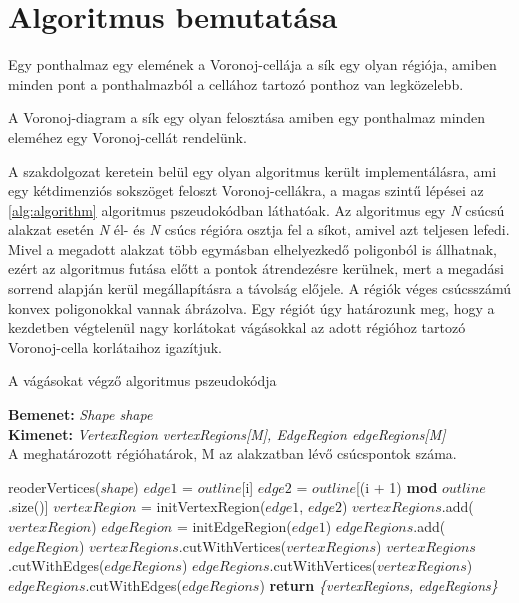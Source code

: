 \section{Algoritmus bemutatása}

\begin{definition}
	Egy ponthalmaz egy elemének a Voronoj-cellája \cite{voronoj} a sík egy olyan régiója, amiben minden pont a ponthalmazból a cellához tartozó ponthoz van legközelebb.
\end{definition}

\begin{definition}
	A Voronoj-diagram a sík egy olyan felosztása amiben egy ponthalmaz minden eleméhez egy Voronoj-cellát rendelünk.
\end{definition}

A szakdolgozat keretein belül egy olyan algoritmus \cite{sdfalgorithmpaper} került implementálásra, ami egy kétdimenziós sokszöget feloszt Voronoj-cellákra, a magas szintű lépései az \ref{alg:algorithm} algoritmus pszeudokódban láthatóak. Az algoritmus egy \textit{N} csúcsú alakzat esetén \textit{N} él- és \textit{N} csúcs régióra osztja fel a síkot, amivel azt teljesen lefedi. Mivel a megadott alakzat több egymásban elhelyezkedő poligonból is állhatnak, ezért az algoritmus futása előtt a pontok átrendezésre kerülnek, mert a megadási sorrend alapján kerül megállapításra a távolság előjele. A régiók véges csúcsszámú konvex poligonokkal vannak ábrázolva. Egy régiót úgy határozunk meg, hogy a kezdetben végtelenül nagy korlátokat vágásokkal az adott régióhoz tartozó Voronoj-cella korlátaihoz igazítjuk.

\begin{algorithm}[H]
	\caption{A vágásokat végző algoritmus pszeudokódja}
	\label{alg:algorithm}
	\textbf{Bemenet:} \textit{Shape shape} \\
	\textbf{Kimenet:} \textit{VertexRegion vertexRegions[M], EdgeRegion edgeRegions[M]}\\A meghatározott régióhatárok, M az alakzatban lévő csúcspontok száma.
	\begin{algorithmic}[1]
		\State reoderVertices(\textit{shape})
		\State $edge1$ = $outline$[i]
		\State $edge2$ = $outline$[(i + 1) \textbf{mod} $outline$.size()]
		\State $vertexRegion$ = initVertexRegion($edge1$, $edge2$)
		\State $vertexRegions$.add($vertexRegion$)
		\State $edgeRegion$ = initEdgeRegion($edge1$)
		\State $edgeRegions$.add($edgeRegion$)
		\EndFor
		\EndFor
		\State $vertexRegions$.cutWithVertices($vertexRegions$)
		\State $vertexRegions$.cutWithEdges($edgeRegions$)
		\State $edgeRegions$.cutWithVertices($vertexRegions$)
		\State $edgeRegions$.cutWithEdges($edgeRegions$)
		\State \textbf{return} \textit{\{vertexRegions, edgeRegions\}}
	\end{algorithmic}
\end{algorithm}

